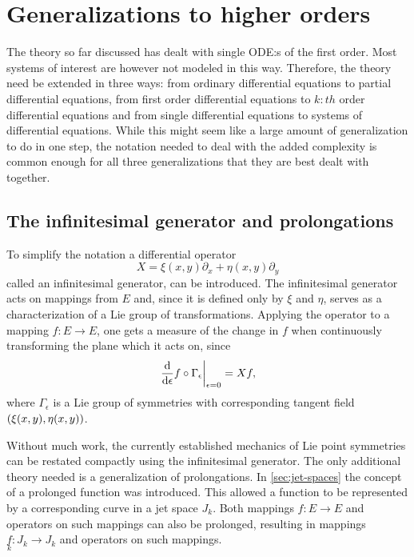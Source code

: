 \section{Generalizations to higher orders}

The theory so far discussed has dealt with single ODE:s of the first order.
Most systems of interest are however not modeled in this way.
Therefore, the theory need be extended in three ways: from ordinary differential equations to partial differential equations, from first order differential equations to \(k:th\) order differential equations and from single differential equations to systems of differential equations.
While this might seem like a large amount of generalization to do in one step, the notation needed to deal with the added complexity is common enough for all three generalizations that they are best dealt with together.

\subsection{The infinitesimal generator and prolongations}

To simplify the notation a differential operator
\begin{equation}
  X = \xi(x,y) \partial_x + \eta(x,y) \partial_y
\end{equation}
called an infinitesimal generator, can be introduced.
The infinitesimal generator acts on mappings from \(E\) and, since it is defined only by \(\xi\) and \(\eta\), serves as a characterization of a Lie group of transformations.
Applying the operator to a mapping \(f: E \to E\), one gets a measure of the change in \(f\) when continuously transforming the plane which it acts on, since
\begin{equation}
  \eval{\dv{\epsilon} f \circ \Gamma_\epsilon}_{\epsilon = 0} = X f,
\end{equation}
where \(\Gamma_\epsilon\) is a Lie group of symmetries with corresponding tangent field \(\pqty{\xi(x,y), \eta(x,y)}\).

Without much work, the currently established mechanics of Lie point symmetries can be restated compactly using the infinitesimal generator.
The only additional theory needed is a generalization of prolongations.
In \cref{sec:jet-spaces} the concept of a prolonged function was introduced.
This allowed a function to be represented by a corresponding curve in a jet space \(J_k\).
Both mappings \(f: E \to E\) and operators on such mappings can also be prolonged, resulting in mappings \(\underset{k}{f}: J_k \to J_k\) and operators on such mappings.

